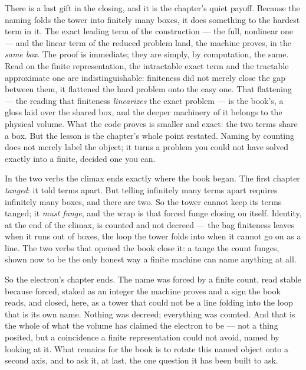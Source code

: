 There is a last gift in the closing, and it is the chapter's quiet payoff. Because the naming folds the tower into
finitely many boxes, it does something to the hardest term in it. The exact leading term of the construction --- the
full, nonlinear one --- and the linear term of the reduced problem land, the machine proves, in the \emph{same box}.
The proof is immediate; they are simply, by computation, the same. Read on the finite representation, the intractable
exact term and the tractable approximate one are indistinguishable: finiteness did not merely close the gap between
them, it flattened the hard problem onto the easy one. That flattening --- the reading that finiteness
\emph{linearizes} the exact problem --- is the book's, a gloss laid over the shared box, and the deeper machinery of it
belongs to the physical volume. What the code proves is smaller and exact: the two terms share a box. But the lesson is
the chapter's whole point restated. Naming by counting does not merely label the object; it turns a problem you could
not have solved exactly into a finite, decided one you can.

In the two verbs the climax ends exactly where the book began. The first chapter \emph{tanged}: it told terms apart.
But telling infinitely many terms apart requires infinitely many boxes, and there are two. So the tower cannot keep its
terms tanged; it \emph{must funge}, and the wrap is that forced funge closing on itself. Identity, at the end of the
climax, is counted and not decreed --- the bag finiteness leaves when it runs out of boxes, the loop the tower folds
into when it cannot go on as a line. The two verbs that opened the book close it: a tange the count funges, shown now
to be the only honest way a finite machine can name anything at all.

So the electron's chapter ends. The name was forced by a finite count, read stable because forced, staked as an integer
the machine proves and a sign the book reads, and closed, here, as a tower that could not be a line folding into the
loop that is its own name. Nothing was decreed; everything was counted. And that is the whole of what the volume has
claimed the electron to be --- not a thing posited, but a coincidence a finite representation could not avoid, named by
looking at it. What remains for the book is to rotate this named object onto a second axis, and to ask it, at last, the
one question it has been built to ask.
